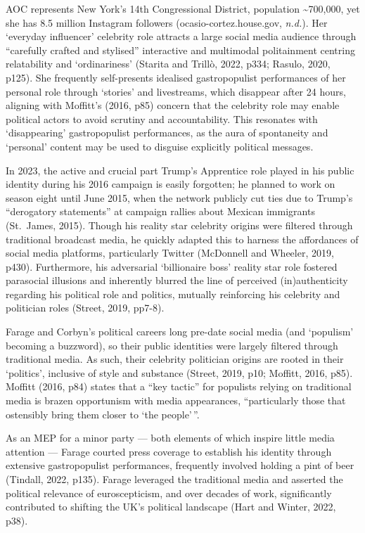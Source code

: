 \documentclass[a4paper, nobind]{templates/ociamthesis}
\begin{document}
AOC represents New York's 14th Congressional District, population \textasciitilde700,000, yet she has 8.5 million Instagram followers (ocasio-cortez.house.gov, \emph{n.d.}). Her `everyday influencer' celebrity role attracts a large social media audience through ``carefully crafted and stylised'' interactive and multimodal politainment centring relatability and `ordinariness' (Starita and Trillò, 2022, p334; Rasulo, 2020, p125). She frequently self-presents idealised gastropopulist performances of her personal role through `stories' and livestreams, which disappear after 24 hours, aligning with Moffitt's (2016, p85) concern that the celebrity role may enable political actors to avoid scrutiny and accountability. This resonates with `disappearing' gastropopulist performances, as the aura of spontaneity and `personal' content may be used to disguise explicitly political messages.

In 2023, the active and crucial part Trump's Apprentice role played in his public identity during his 2016 campaign is easily forgotten; he planned to work on season eight until June 2015, when the network publicly cut ties due to Trump's ``derogatory statements'' at campaign rallies about Mexican immigrants (St.~James, 2015). Though his reality star celebrity origins were filtered through traditional broadcast media, he quickly adapted this to harness the affordances of social media platforms, particularly Twitter (McDonnell and Wheeler, 2019, p430). Furthermore, his adversarial `billionaire boss' reality star role fostered parasocial illusions and inherently blurred the line of perceived (in)authenticity regarding his political role and politics, mutually reinforcing his celebrity and politician roles (Street, 2019, pp7-8).

Farage and Corbyn's political careers long pre-date social media (and `populism' becoming a buzzword), so their public identities were largely filtered through traditional media. As such, their celebrity politician origins are rooted in their `politics', inclusive of style and substance (Street, 2019, p10; Moffitt, 2016, p85). Moffitt (2016, p84) states that a ``key tactic'' for populists relying on traditional media is brazen opportunism with media appearances, ``particularly those that ostensibly bring them closer to `the people'\,''.

As an MEP for a minor party --- both elements of which inspire little media attention --- Farage courted press coverage to establish his identity through extensive gastropopulist performances, frequently involved holding a pint of beer (Tindall, 2022, p135). Farage leveraged the traditional media and asserted the political relevance of euroscepticism, and over decades of work, significantly contributed to shifting the UK's political landscape (Hart and Winter, 2022, p38).
\end{document}
